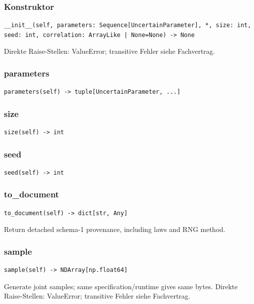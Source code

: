 \subsubsection*{Konstruktor}
\begin{lstlisting}
__init__(self, parameters: Sequence[UncertainParameter], *, size: int, seed: int, correlation: ArrayLike | None=None) -> None
\end{lstlisting}
Direkte Raise-Stellen: ValueError; transitive Fehler siehe Fachvertrag.
\subsubsection*{parameters}
\begin{lstlisting}
parameters(self) -> tuple[UncertainParameter, ...]
\end{lstlisting}
\subsubsection*{size}
\begin{lstlisting}
size(self) -> int
\end{lstlisting}
\subsubsection*{seed}
\begin{lstlisting}
seed(self) -> int
\end{lstlisting}
\subsubsection*{to\_document}
\begin{lstlisting}
to_document(self) -> dict[str, Any]
\end{lstlisting}
Return detached schema-1 provenance, including laws and RNG method.
\subsubsection*{sample}
\begin{lstlisting}
sample(self) -> NDArray[np.float64]
\end{lstlisting}
Generate joint samples; same specification/runtime gives same bytes.
Direkte Raise-Stellen: ValueError; transitive Fehler siehe Fachvertrag.
